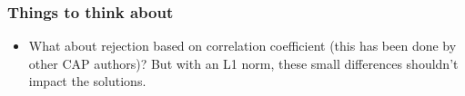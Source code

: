 \subsubsection*{Things to think about}

\begin{itemize}
\item What about rejection based on correlation coefficient (this has been done by other CAP authors)? But with an L1 norm, these small differences shouldn’t impact the solutions.
\end{itemize}
